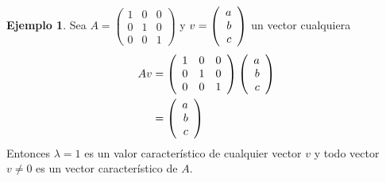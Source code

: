 \documentclass[10pt,a4paper]{report}
\theoremstyle{definition}
\newtheorem{ejemplo}{Ejemplo}[chapter]
\theoremstyle{remark}
\numberwithin{section}{chapter}
\numberwithin{equation}{chapter}
\numberwithin{tacounter}{chapter}
\begin{document}
\begin{ejemplo}
Sea $A = \left( \begin{array}{rrr}
1 & 0 & 0\\
0 & 1 & 0\\
0 & 0 & 1
\end{array} \right)$ y $v = \left( \begin{array}{r} a\\ b\\ c \end{array} \right) $ un vector cualquiera
\begin{align*}
Av &= \left( \begin{array}{rrr}
1 & 0 & 0\\
0 & 1 & 0\\
0 & 0 & 1
\end{array} \right) \left( \begin{array}{r} a\\ b\\ c \end{array} \right) \\
&= \left( \begin{array}{r} a\\ b\\ c \end{array} \right) 
\end{align*}
Entonces $\lambda = 1$ es un valor característico de cualquier vector $v$ y todo vector $v \neq 0$ es un vector característico de $A$.
\end{ejemplo}
\end{document}
